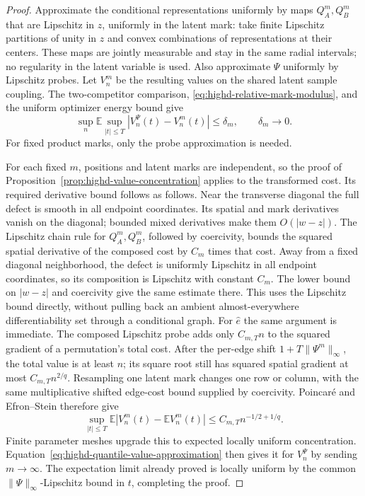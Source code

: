 \documentclass[11pt,reqno]{amsart}
\theoremstyle{definition}
\theoremstyle{remark}
\numberwithin{equation}{section}
\newcommand{\E}{\mathbb E}
\begin{document}
\begin{proof}
Approximate the conditional representations uniformly by maps \(Q_A^m,Q_B^m\)
that are Lipschitz in \(z\), uniformly in the latent mark: take finite
Lipschitz partitions of unity in \(z\) and convex combinations of
representations at their centers. These maps are jointly measurable
and stay in the same radial intervals; no regularity in the latent
variable is used.
Also approximate \(\Psi\) uniformly by Lipschitz probes. Let \(V_n^m\)
be the resulting values on the shared latent sample coupling. The
two-competitor comparison, \eqref{eq:highd-relative-mark-modulus}, and
the uniform optimizer energy bound give
\begin{equation}
\label{eq:highd-quantile-value-approximation}
 \sup_n\E\sup_{|t|\le T}|V_n^\Psi(t)-V_n^m(t)|
       \le\delta_m,\qquad \delta_m\longrightarrow0.
\end{equation}
For fixed product marks, only the probe approximation is needed.

For each fixed \(m\), positions and latent marks are independent, so
the proof of Proposition~\ref{prop:highd-value-concentration} applies
to the transformed cost. Its required derivative bound follows as
follows. Near the transverse diagonal the full defect is smooth in
all endpoint coordinates. Its spatial and mark derivatives vanish
on the diagonal; bounded mixed derivatives make them \(O(|w-z|)\).
The Lipschitz chain rule for \(Q_A^m,Q_B^m\), followed by coercivity,
bounds the squared spatial derivative of the composed cost by
\(C_m\) times that cost. Away from a fixed diagonal neighborhood,
the defect is uniformly Lipschitz in all endpoint coordinates, so
its composition is Lipschitz with constant \(C_m\). The lower bound
on \(|w-z|\) and coercivity give the same estimate there. This uses
the Lipschitz bound directly, without pulling back an ambient
almost-everywhere differentiability set through a conditional graph.
For \(\widehat e\) the same argument is immediate. The composed Lipschitz
probe adds only \(C_{m,T}n\) to the squared gradient of a permutation's
total cost. After the per-edge shift \(1+T\|\Psi^m\|_\infty\),
the total value is at least \(n\); its square root still has squared
spatial gradient at most \(C_{m,T}n^{2/q}\). Resampling one latent
mark changes one row or column, with the same multiplicative shifted
edge-cost bound supplied by coercivity. Poincar\'e and Efron--Stein
therefore give
\[
 \sup_{|t|\le T}\E|V_n^m(t)-\E V_n^m(t)|
       \le C_{m,T}n^{-1/2+1/q}.
\]
Finite parameter meshes upgrade this to expected locally uniform
concentration. Equation~\eqref{eq:highd-quantile-value-approximation}
then gives it for \(V_n^\Psi\) by sending \(m\to\infty\).
The expectation limit already proved is locally uniform by the common
\(\|\Psi\|_\infty\)-Lipschitz bound in \(t\), completing the proof.
\end{proof}
\end{document}
